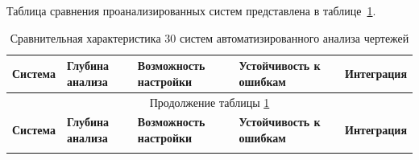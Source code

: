 Таблица сравнения проанализированных систем представлена в таблице~\ref{tab:comparison_full}.

{
\small
\begin{longtable}{|p{3.85cm}|p{2.75cm}|p{2.75cm}|p{2.75cm}|p{2.75cm}|}
\caption{Сравнительная характеристика 30 систем автоматизированного анализа чертежей}
\label{tab:comparison_full} \\
\hline
\textbf{Система} & 
\textbf{Глубина анализа} & 
\textbf{Возможность настройки} &
\textbf{Устойчивость к ошибкам} &
\textbf{Интеграция} \\
\hline
\endfirsthead

\multicolumn{5}{c}{Продолжение таблицы \ref{tab:comparison_full}} \\
\hline
\textbf{Система} & 
\textbf{Глубина анализа} & 
\textbf{Возможность настройки} &
\textbf{Устойчивость к ошибкам} &
\textbf{Интеграция} \\
\hline
\endhead

\hline
\endlastfoot


\end{longtable}}

